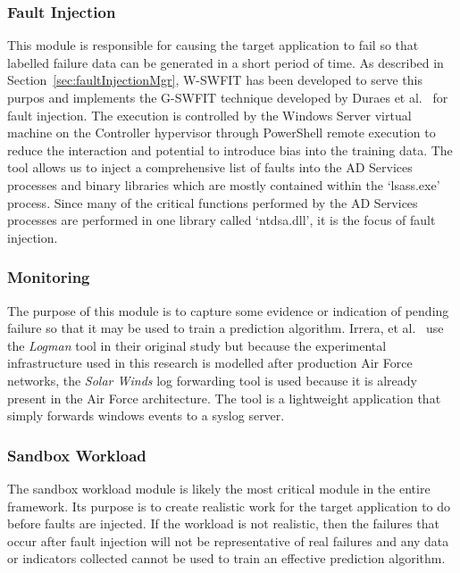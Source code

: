 \subsubsection{Fault Injection} \label{sec:faultInjectionTool} 
This module is responsible for causing the target application to fail so that
labelled failure data can be generated in a short period of time.  As described
in Section~\ref{sec:faultInjectionMgr}, W-SWFIT has been developed to serve
this purpos and implements the G-SWFIT technique developed by Duraes et
al.~\cite{gswfit} for fault injection.  The execution is controlled by the
Windows Server virtual machine on the Controller hypervisor through PowerShell
remote execution to reduce the interaction and potential to introduce bias into
the training data.  The tool allows us to inject a comprehensive list of faults
into the AD Services processes and binary libraries which are mostly contained
within the `lsass.exe' process.  Since many of the critical functions performed
by the AD Services processes are performed in one library called `ntdsa.dll',
it is the focus of fault injection.

\subsubsection{Monitoring} \label{sec:sandboxMonitoringTool} 
The purpose of this module is to capture some evidence or indication of pending
failure so that it may be used to train a prediction algorithm.  Irrera, et
al.~\cite{irrera2015} use the \emph{Logman} tool in their original study but
because the experimental infrastructure used in this research is modelled after
production Air Force networks, the \emph{Solar Winds} log forwarding tool is
used because it is already present in the Air Force architecture.  The tool is
a lightweight application that simply forwards windows events to a syslog
server.

\subsubsection{Sandbox Workload}  \label{sec:sandboxWorkload} 
The sandbox workload module is likely the most critical module in the entire
framework.  Its purpose is to create realistic work for the target application
to do before faults are injected.  If the workload is not realistic, then the
failures that occur after fault injection will not be representative of real
failures and any data or indicators collected cannot be used to train an
effective prediction algorithm.

